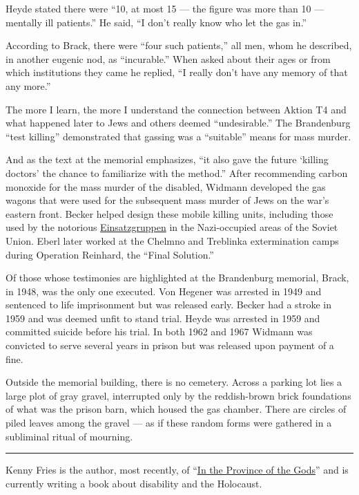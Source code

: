 Heyde stated there were ``10, at most 15 --- the figure was more than 10
--- mentally ill patients.'' He said, ``I don't really know who let the
gas in.''

According to Brack, there were ``four such patients,'' all men, whom he
described, in another eugenic nod, as ``incurable.'' When asked about
their ages or from which institutions they came he replied, ``I really
don't have any memory of that any more.''

The more I learn, the more I understand the connection between Aktion T4
and what happened later to Jews and others deemed ``undesirable.'' The
Brandenburg ``test killing'' demonstrated that gassing was a
``suitable'' means for mass murder.

And as the text at the memorial emphasizes, ``it also gave the future
`killing doctors' the chance to familiarize with the method.'' After
recommending carbon monoxide for the mass murder of the disabled,
Widmann developed the gas wagons that were used for the subsequent mass
murder of Jews on the war's eastern front. Becker helped design these
mobile killing units, including those used by the notorious
\href{https://www.nytimes3xbfgragh.onion/2002/06/30/books/himmler-s-willing-executioners.html}{Einsatzgruppen}
in the Nazi-occupied areas of the Soviet Union. Eberl later worked at
the Chelmno and Treblinka extermination camps during Operation Reinhard,
the ``Final Solution.''

Of those whose testimonies are highlighted at the Brandenburg memorial,
Brack, in 1948, was the only one executed. Von Hegener was arrested in
1949 and sentenced to life imprisonment but was released early. Becker
had a stroke in 1959 and was deemed unfit to stand trial. Heyde was
arrested in 1959 and committed suicide before his trial. In both 1962
and 1967 Widmann was convicted to serve several years in prison but was
released upon payment of a fine.

Outside the memorial building, there is no cemetery. Across a parking
lot lies a large plot of gray gravel, interrupted only by the
reddish-brown brick foundations of what was the prison barn, which
housed the gas chamber. There are circles of piled leaves among the
gravel --- as if these random forms were gathered in a subliminal ritual
of mourning.

\begin{center}\rule{0.5\linewidth}{\linethickness}\end{center}

Kenny Fries is the author, most recently, of
``\href{https://www.kennyfries.com/works}{In the Province of the Gods}''
and is currently writing a book about disability and the Holocaust.

